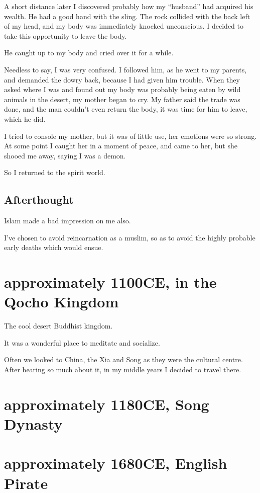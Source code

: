 A short distance later I discovered probably how my ``husband'' had acquired his
wealth. He had a good hand with the sling. The rock collided with the back left
of my head, and my body was immediately knocked unconscious. I decided to take
this opportunity to leave the body.

He caught up to my body and cried over it for a while.

Needless to say, I was very confused. I followed him, as he went to my parents,
and demanded the dowry back, because I had given him trouble. When they asked
where I was and found out my body was probably being eaten by wild animals in
the desert, my mother began to cry. My father said the trade was done, and the
man couldn't even return the body, it was time for him to leave, which he did.

I tried to console my mother, but it was of little use, her emotions were so
strong. At some point I caught her in a moment of peace, and came to her, but
she shooed me away, saying I was a demon.

So I returned to the spirit world.

\section{Afterthought}

Islam made a bad impression on me also. 

I've chosen to avoid reincarnation as a muslim, so as to avoid the highly
probable early deaths which would ensue. 

\chapter{approximately 1100CE, in the Qocho Kingdom}
The cool desert Buddhist kingdom.

It was a wonderful place to meditate and socialize. 

Often we looked to China, the Xia and Song as they were the cultural centre. 
After hearing so much about it, in my middle years I decided to travel there.

\chapter{approximately 1180CE, Song Dynasty}

\chapter{approximately 1680CE, English Pirate}
\label{reincarnation:pirate}

